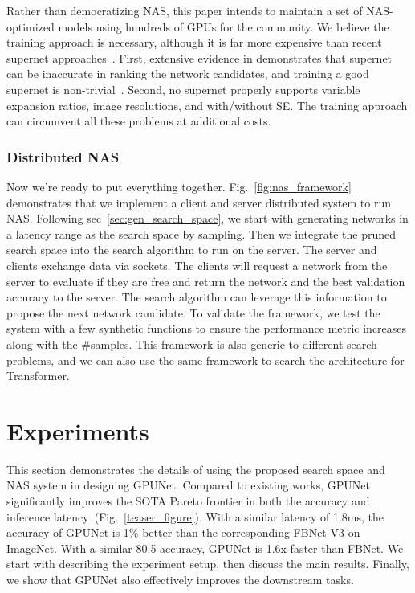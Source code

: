 \documentclass[10pt,twocolumn,letterpaper]{article}
\begin{document}
Rather than democratizing NAS, this paper intends to maintain a set of NAS-optimized models using hundreds of GPUs for the community. We believe the training approach is necessary, although it is far more expensive than recent supernet approaches~\cite{pham2018efficient}. First, extensive evidence in \cite{zhao2021few, yu2019evaluating} demonstrates that supernet can be inaccurate in ranking the network candidates, and training a good supernet is non-trivial~\cite{yu2020train}. Second, no supernet properly supports variable expansion ratios, image resolutions, and with/without SE. The training approach can circumvent all these problems at additional costs.

\subsubsection{Distributed NAS}
Now we're ready to put everything together. Fig.~\ref{fig:nas_framework} demonstrates that we implement a client and server distributed system to run NAS. Following sec~\ref{sec:gen_search_space}, we start with generating networks in a latency range as the search space by sampling. Then we integrate the pruned search space into the search algorithm to run on the server. The server and clients exchange data via sockets. The clients will request a network from the server to evaluate if they are free and return the network and the best validation accuracy to the server. The search algorithm can leverage this information to propose the next network candidate. To validate the framework, we test the system with a few synthetic functions to ensure the performance metric increases along with the \#samples. This framework is also generic to different search problems, and we can also use the same framework to search the architecture for Transformer.

\section{Experiments}

This section demonstrates the details of using the proposed search space and NAS system in designing GPUNet. Compared to existing works, GPUNet significantly improves the SOTA Pareto frontier in both the accuracy and inference latency~(Fig.~\ref{teaser_figure}). With a similar latency of 1.8ms, the accuracy of GPUNet is 1\% better than the corresponding FBNet-V3 on ImageNet. With a similar 80.5 accuracy, GPUNet is 1.6x faster than FBNet. We start with describing the experiment setup, then discuss the main results. Finally, we show that GPUNet also effectively improves the downstream tasks.
\end{document}
